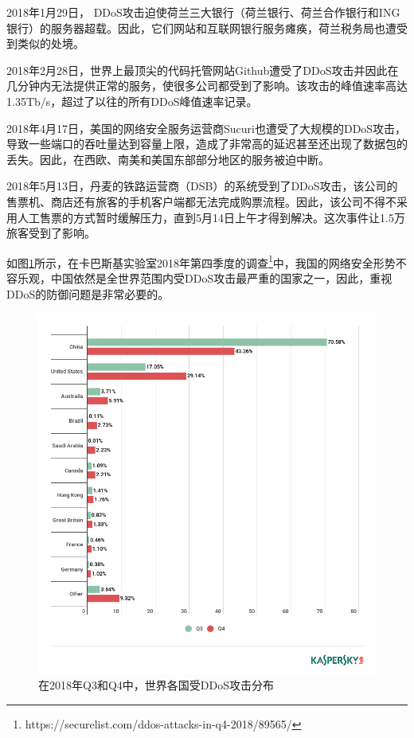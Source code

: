 2018年1月29日， DDoS攻击迫使荷兰三大银行（荷兰银行、荷兰合作银行和ING银行）的服务器超载。因此，它们网站和互联网银行服务瘫痪，荷兰税务局也遭受到类似的处境。

2018年2月28日，世界上最顶尖的代码托管网站Github遭受了DDoS攻击并因此在几分钟内无法提供正常的服务，使很多公司都受到了影响。该攻击的峰值速率高达1.35Tb/s，超过了以往的所有DDoS峰值速率记录。

2018年4月17日，美国的网络安全服务运营商Sucuri也遭受了大规模的DDoS攻击，导致一些端口的吞吐量达到容量上限，造成了非常高的延迟甚至还出现了数据包的丢失。因此，在西欧、南美和美国东部部分地区的服务被迫中断。

2018年5月13日，丹麦的铁路运营商（DSB）的系统受到了DDoS攻击，该公司的售票机、商店还有旅客的手机客户端都无法完成购票流程。因此，该公司不得不采用人工售票的方式暂时缓解压力，直到5月14日上午才得到解决。这次事件让1.5万旅客受到了影响。

如图\ref{fig:ddos_countries}所示，在卡巴斯基实验室2018年第四季度的调查\footnote{https://securelist.com/ddos-attacks-in-q4-2018/89565/}中，我国的网络安全形势不容乐观，中国依然是全世界范围内受DDoS攻击最严重的国家之一，因此，重视DDoS的防御问题是非常必要的。

\begin{figure}
    \centering
    \includegraphics[scale=0.5]{figures/en-ddos-by-countries.png}
    \caption{在2018年Q3和Q4中，世界各国受DDoS攻击分布}
    \label{fig:ddos_countries}
\end{figure}


